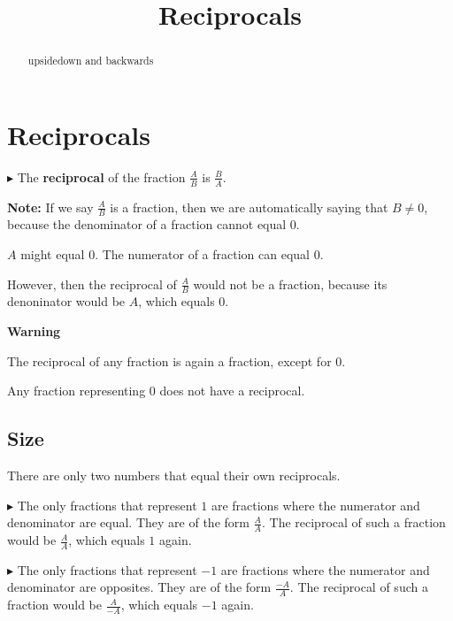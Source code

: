 \documentclass{ximera}
\title{Reciprocals}
\begin{document}
\begin{abstract}
upsidedown and backwards
\end{abstract}
\maketitle




\section*{Reciprocals}


\textbf{\textcolor{red!70!black}{$\blacktriangleright$}} The \textbf{reciprocal} of the fraction $\frac{A}{B}$ is $\frac{B}{A}$.





\textbf{Note:} If we say $\frac{A}{B}$ is a fraction, then we are automatically saying that $B \ne 0$, because the denominator of a fraction cannot equal $0$. 

$A$ might equal $0$.  The numerator of a fraction can equal $0$. 


However, then the reciprocal of $\frac{A}{B}$ would not be a fraction, because its denoninator would be $A$, which equals $0$.



\begin{warning} \textbf{\textcolor{red!70!black}{Warning}}

The reciprocal of any fraction is again a fraction, except for $0$. 

Any fraction representing $0$ does not have a reciprocal.


\end{warning}



\subsection*{Size}



There are only two numbers that equal their own reciprocals.



$\blacktriangleright$ The only fractions that represent $1$ are fractions where the numerator and denominator are equal.  They are of the form $\frac{A}{A}$.  The reciprocal of such a fraction would be $\frac{A}{A}$, which equals $1$ again.


$\blacktriangleright$ The only fractions that represent $-1$ are fractions where the numerator and denominator are opposites.  They are of the form $\frac{-A}{A}$.  The reciprocal of such a fraction would be $\frac{A}{-A}$, which equals $-1$ again.
\end{document}
